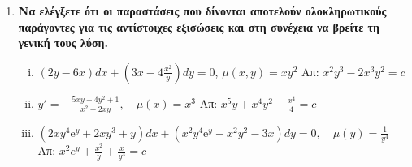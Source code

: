 \documentclass[a4paper,table]{report}
\begin{document}
\begin{enumerate}
  \item {\bfseries Να ελέγξετε ότι οι παραστάσεις που δίνονται αποτελούν ολοκληρωτικούς 
      παράγοντες για τις αντίστοιχες εξισώσεις και στη συνέχεια να βρείτε τη γενική 
    τους λύση.}
    \begin{enumerate}[i)]
      \item $ (2y-6x)dx+\left(3x-4\frac{x^{2}}{y}\right)dy=0 $, \; $ \mu (x,y) = 
        xy^{2} $
        \hfill Απ: $ x^{2}y^{3}-2x^{3}y^{2}=c $ %
      \item $ y' =- \frac{5xy+4y^{2}+1}{x^{2}+2xy}, \quad \mu(x)=x^{3} $  
        \hfill Απ: $ x^{5}y+x^{4}y^{2} + \frac{x^{4}}{4} = c $ 
      \item $ (2xy^{4} \mathrm{e}^{y} + 2xy^{3}+y)dx + (x^{2}y^{4}\mathrm{e}^{y} -
        x^{2}y^{2}-3x)dy=0, \quad \mu (y) = \frac{1}{y^{4}} $ 
        \hfill Απ: $ x^{2}e^{y}+ \frac{x^{2}}{y} + \frac{x}{y^{3}} =c $ 
    \end{enumerate}



\end{enumerate}
\end{document}

